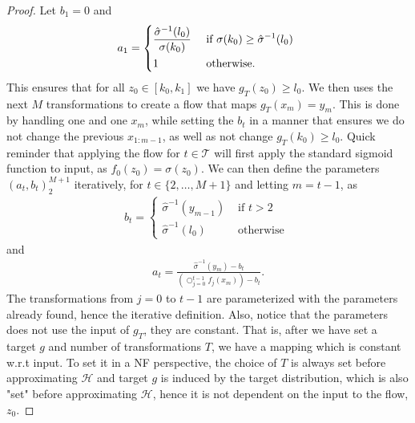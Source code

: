 \begin{proof}
    Let \(b_1 = 0\) and
    \begin{align*}
        a_1 =
        \begin{dcases}
            \frac{\hat{\sigma}^{-1}(l_0)}{\sigma(k_0)} & \text{ if \(\sigma(k_0) \geq \hat{\sigma}^{-1}(l_0)\) }\\
            1 & \text{ otherwise. }
        \end{dcases}
    \end{align*}
    This ensures that for all \(z_0 \in [k_0, k_1]\) we have \(g_T(z_0) \geq l_0\).
    We then uses the next \(M\) transformations to create a flow that maps \(g_T(x_m)=y_m\). This is done by handling one
    and one \(x_m\), while setting the \(b_t\) in a manner that ensures we do not change the previous \(x_{1:m-1}\), as well as
    not change \(g_T(k_0) \geq l_0\). Quick reminder that applying the flow for \(t \in \mathcal{T}\) will first apply the standard sigmoid function to 
    input, as \(f_0(z_0) = \sigma(z_0)\). We can then define the parameters \((a_t,b_t)^{M+1}_2\) iteratively, for \(t \in \{2,\dots,M+1\}\) and 
    letting \(m=t-1\), as 
    \begin{align*}
        b_t =
        \begin{cases}
            \hat{\sigma}^{-1}(y_{m-1}) & \text{ if \(t > 2\) } \\
            \hat{\sigma}^{-1}(l_0) & \text{ otherwise }
        \end{cases}
    \end{align*}
    and
    \begin{align*}
        a_t = \frac{\hat{\sigma}^{-1}(y_m) - b_t}{\left(\bigcirc_{j=0}^{t-1} f_j(x_m)\right) - b_t}.
    \end{align*}
    The transformations from \(j=0\) to \(t-1\) are parameterized with the parameters already found, hence the iterative definition.
    Also, notice that the parameters does not use the input of \(g_T\), they are constant. That is, after we have set a target \(g\) and 
    number of transformations \(T\), we have a mapping which is constant w.r.t input. To set it in a NF perspective, 
    the choice of \(T\) is always set before approximating \(\mathcal{H}\) and target \(g\) is induced by the target distribution, which
    is also "set" before approximating \(\mathcal{H}\), hence it is not dependent on the input to the flow, \(z_0\). 


\end{proof}
